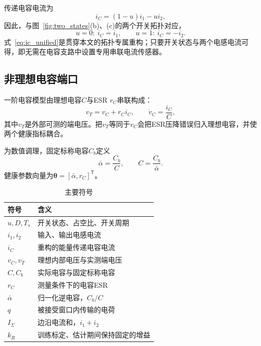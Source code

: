 \documentclass[zihao=5,a4paper]{ctexart}
\newcommand{\alphab}{\bar{\alpha}}
\newcommand{\vect}[1]{\bm{#1}}
\begin{document}
传递电容电流为
\begin{equation}
i_C=(1-u)i_1-ui_2,
\label{eq:ic_unified}
\end{equation}
因此，与图~\ref{fig:two_states}(b)、(c)的两个开关拓扑对应，
\begin{equation}
u=0:\ i_C=i_1, \qquad u=1:\ i_C=-i_2.
\label{eq:ic_states}
\end{equation}
式~\eqref{eq:ic_unified}是贯穿本文的拓扑专属重构；只要开关状态与两个电感电流可得，即无需在电容支路中设置专用串联电流传感器。

\subsection{非理想电容端口}

一阶电容模型由理想电容$C$与ESR $r_C$串联构成：
\begin{equation}
v_T=v_C+r_C i_C, \qquad \dot v_C=\frac{i_C}{C},
\label{eq:cap_port}
\end{equation}
其中$v_T$是外部可测的端电压。把$v_T$等同于$v_C$会把ESR压降错误归入理想电容，并使两个健康指标耦合。

为数值调理，固定标称电容$C_b$定义
\begin{equation}
\alphab=\frac{C_b}{C}, \qquad C=\frac{C_b}{\alphab}.
\label{eq:alpha_definition}
\end{equation}
健康参数向量为$\vect{\theta}=[\alphab,r_C]^{\mathsf T}$。

\begin{table}[t]
\caption{主要符号}
\label{tab:notation}
\centering
\begin{tabular}{ll}
\toprule
符号 & 含义 \\
\midrule
$u,D,T_s$ & 开关状态、占空比、开关周期 \\
$i_1,i_2$ & 输入、输出电感电流 \\
$i_C$ & 重构的能量传递电容电流 \\
$v_C,v_T$ & 理想内部电压与实测端电压 \\
$C,C_b$ & 实际电容与固定标称电容 \\
$r_C$ & 测量条件下的电容ESR \\
$\alphab$ & 归一化逆电容，$C_b/C$ \\
$q$ & 被接受窗口内传输的电荷 \\
$I_\Sigma$ & 边沿电流和，$i_1+i_2$ \\
$k_R$ & 训练标定、估计期间保持固定的增益 \\
\bottomrule
\end{tabular}
\end{table}
\end{document}

